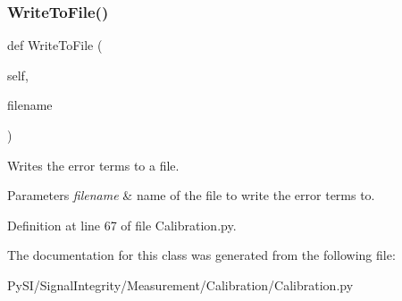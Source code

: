 \subsubsection{\texorpdfstring{Write\+To\+File()}{WriteToFile()}}
{\footnotesize\ttfamily def Write\+To\+File (\begin{DoxyParamCaption}\item[{}]{self,  }\item[{}]{filename }\end{DoxyParamCaption})}



Writes the error terms to a file. 


\begin{DoxyParams}{Parameters}
{\em filename} & name of the file to write the error terms to. \\
\hline
\end{DoxyParams}


Definition at line 67 of file Calibration.\+py.



The documentation for this class was generated from the following file\+:\begin{DoxyCompactItemize}
\item 
Py\+S\+I/\+Signal\+Integrity/\+Measurement/\+Calibration/Calibration.\+py\end{DoxyCompactItemize}
